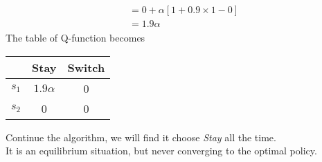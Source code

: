 \documentclass{myhw}
\begin{document}
\begin{homeworkProblem}
\begin{homeworkSection}
\begin{gather*}
\begin{aligned}
&= 0 + \alpha [1 + 0.9 \times 1 - 0] \\
&= 1.9 \alpha
\end{aligned}
\end{gather*}
The table of Q-function becomes 
\begin{center}
\begin{tabular}{c|c|c}
  & Stay & Switch \\ 
 \hline
 $s_1$ & $1.9\alpha$ & 0 \\  
 \hline
 $s_2$ & 0 & 0    
\end{tabular} 
\end{center}
Continue the algorithm, we will find it choose \emph{Stay} all the time. \\
It is an equilibrium situation, but never converging to the optimal policy.
\end{homeworkSection}
\end{homeworkProblem}
\end{document}
